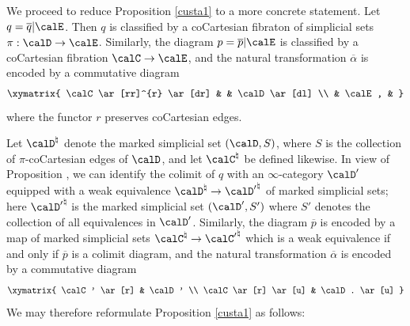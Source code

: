 We proceed to reduce Proposition \ref{custa1} to a more concrete statement. Let
$q = \overline{q} | \calE$. Then $q$ is classified by a coCartesian fibraton of simplicial sets
$\pi: \calD \rightarrow \calE$. Similarly, the diagram $p = \overline{p} | \calE$ is classified by a coCartesian fibration $\calC \rightarrow \calE$, and the natural transformation $\overline{\alpha}$ is encoded by a commutative diagram
$$ \xymatrix{ \calC \ar[rr]^{r} \ar[dr] & & \calD \ar[dl] \\
& \calE, & }$$
where the functor $r$ preserves coCartesian edges. 

Let $\calD^{\natural}$ denote the marked simplicial set $(\calD,S)$, where
$S$ is the collection of $\pi$-coCartesian edges of $\calD$, and let $\calC^{\natural}$ be defined likewise. In view of Proposition , we can identify the colimit of $q$ with an $\infty$-category
$\calD'$ equipped with a weak equivalence $\calD^{\natural} \rightarrow {\calD'}^{\natural}$ of marked
simplicial sets; here ${\calD'}^{\natural}$ is the marked simplicial set $(\calD', S')$ where $S'$ denotes the collection of all equivalences in $\calD'$. Similarly, the diagram $\overline{p}$ is encoded by a map
of marked simplicial sets $\calC^{\natural} \rightarrow {\calC'}^{\natural}$ which is a weak equivalence if and only if $\overline{p}$ is a colimit diagram, and the natural transformation $\overline{\alpha}$ is encoded by a commutative diagram
$$ \xymatrix{ \calC' \ar[r] & \calD' \\
\calC \ar[r] \ar[u] & \calD. \ar[u] }$$
We may therefore reformulate Proposition \ref{custa1} as follows:

